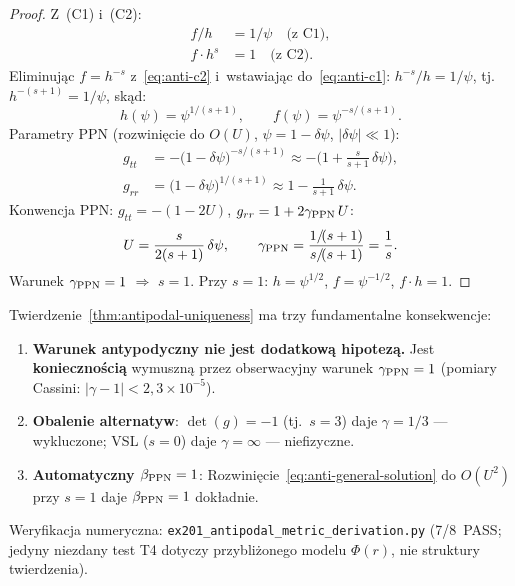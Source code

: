 \begin{proof}
Z~(C1) i~(C2):
\begin{align}
  f/h &= 1/\psi \quad\text{(z C1)}, \label{eq:anti-c1} \\
  f \cdot h^s &= 1 \quad\text{(z C2)}. \label{eq:anti-c2}
\end{align}
Eliminuj\k{a}c $f = h^{-s}$ z~\eqref{eq:anti-c2}
i~wstawiaj\k{a}c do~\eqref{eq:anti-c1}:
$h^{-s}/h = 1/\psi$, tj.~$h^{-(s+1)} = 1/\psi$, sk\k{a}d:
\begin{equation}
  h(\psi) = \psi^{1/(s+1)},
  \qquad
  f(\psi) = \psi^{-s/(s+1)}.
  \label{eq:anti-general-solution}
\end{equation}
Parametry PPN (rozwinięcie do $O(U)$, $\psi = 1 - \delta\psi$, $|\delta\psi| \ll 1$):
\begin{align}
  g_{tt} &= -\bigl(1 - \delta\psi\bigr)^{-s/(s+1)}
  \approx -\bigl(1 + \tfrac{s}{s+1}\,\delta\psi\bigr), \nonumber\\
  g_{rr} &= \bigl(1 - \delta\psi\bigr)^{1/(s+1)}
  \approx 1 - \tfrac{1}{s+1}\,\delta\psi.
\end{align}
Konwencja PPN: $g_{tt} = -(1 - 2U)$, $g_{rr} = 1 + 2\gamma_{\rm PPN}\,U$:
\begin{equation}
  U = \frac{s}{2(s+1)}\,\delta\psi,
  \qquad
  \gamma_{\rm PPN} = \frac{1/\!(s+1)}{s/\!(s+1)} = \frac{1}{s}.
  \label{eq:anti-gamma-of-s}
\end{equation}
Warunek $\gamma_{\rm PPN} = 1$ $\Longrightarrow$ $s = 1$.
Przy $s = 1$: $h = \psi^{1/2}$, $f = \psi^{-1/2}$, $f\cdot h = 1$.
\end{proof}

\begin{remark}%
\label{rem:antipodal-implications}
Twierdzenie~\ref{thm:antipodal-uniqueness} ma trzy fundamentalne konsekwencje:
\begin{enumerate}[nosep]
  \item \textbf{Warunek antypodyczny nie jest dodatkow\k{a} hipotez\k{a}.}
    Jest \textbf{konieczno\'sci\k{a}} wymuszn\k{a} przez obserwacyjny
    warunek $\gamma_{\rm PPN} = 1$
    (pomiary Cassini: $|\gamma - 1| < 2{,}3 \times 10^{-5}$).
  \item \textbf{Obalenie alternatyw}: $\det(g) = -1$ (tj.~$s = 3$) daje
    $\gamma = 1/3$ --- wykluczone; VSL ($s = 0$) daje $\gamma = \infty$
    --- niefizyczne.
  \item \textbf{Automatyczny $\beta_{\rm PPN} = 1$}:
    Rozwinięcie~\eqref{eq:anti-general-solution} do $O(U^2)$
    przy $s = 1$ daje $\beta_{\rm PPN} = 1$ dok\l{}adnie.
\end{enumerate}
Weryfikacja numeryczna: \texttt{ex201\_antipodal\_metric\_derivation.py}
(7/8~PASS; jedyny niezdany test T4 dotyczy przybli\.zonego modelu
$\Phi(r)$, nie struktury twierdzenia).
\end{remark}





